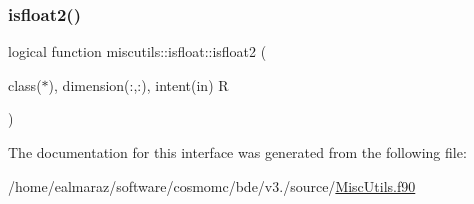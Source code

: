 \mbox{\label{interfacemiscutils_1_1isfloat_a5a81a1df18f642eb86845fe1715c59eb}} 
\subsubsection{\texorpdfstring{isfloat2()}{isfloat2()}}
{\footnotesize\ttfamily logical function miscutils\+::isfloat\+::isfloat2 (\begin{DoxyParamCaption}\item[{class($\ast$), dimension(\+:,\+:), intent(in)}]{R }\end{DoxyParamCaption})}



The documentation for this interface was generated from the following file\+:\begin{DoxyCompactItemize}
\item 
/home/ealmaraz/software/cosmomc/bde/v3./source/\mbox{\hyperlink{MiscUtils_8f90}{Misc\+Utils.\+f90}}\end{DoxyCompactItemize}
